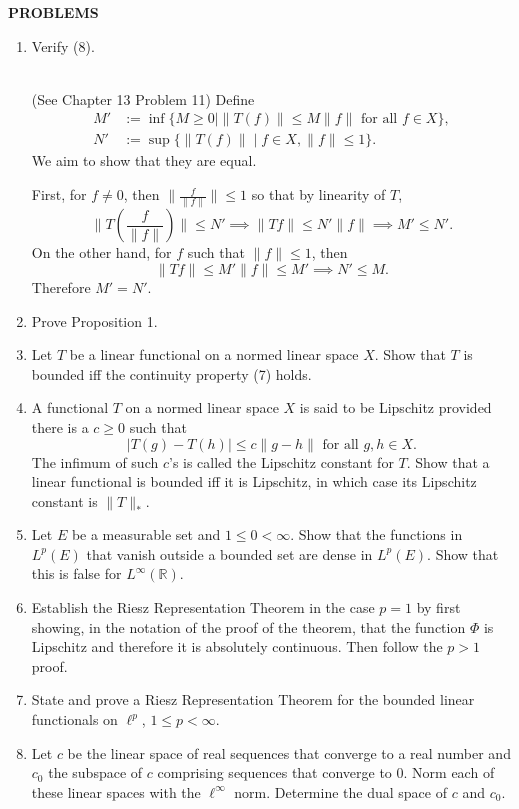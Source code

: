 \begin{center}
	\textbf{PROBLEMS}
\end{center}
\begin{enumerate}
	\setcounter{enumi}{0}
    \item Verify (8).
    
    \ \\(See Chapter 13 Problem 11) 
    Define 
    \[
        \begin{split}
        M'&:=\inf\{M\ge0\mid\|T(f)\|\le M\|f\|\text{ for all }f\in X\},\\
        N'&:=\sup\{\|T(f)\|\mid f\in X, \|f\|\le1\}.
        \end{split}
    \]
    We aim to show that they are equal.
    
    First, for $f\neq0$, then $\|\frac{f}{\|f\|}\|\le1$ so that by linearity of $T$,
    \[\|T(\frac{f}{\|f\|})\|\le N'\implies\|Tf\|\le N'\|f\|\implies M'\le N'.\]
    On the other hand, for $f$ such that $\|f\|\le1$, then
    \[\|Tf\|\le M'\|f\|\le M'\implies N'\le M.\]
    Therefore $M'=N'$.
    \\\item Prove Proposition 1.
    \item Let $T$ be a linear functional on a normed linear space $X$. Show that $T$ is bounded iff the continuity property (7) holds.
    \item A functional $T$ on a normed linear space $X$ is said to be Lipschitz provided there is a $c\ge0$ such that
    \[
        |T(g)-T(h)|\le c\|g-h\|\text{ for all }g,h\in X.  
    \]
    The infimum of such $c$'s is called the Lipschitz constant for $T$. Show that a linear functional is bounded iff it is Lipschitz, in which case its Lipschitz constant is $\|T\|_*$.
    \item Let $E$ be a measurable set and $1\le 0<\infty$. Show that the functions in $L^p(E)$ that vanish outside a bounded set are dense in $L^p(E)$. Show that this is false for $L^\infty(\mathbb{R})$.
    \item Establish the Riesz Representation Theorem in the case $p=1$ by first showing, in the notation of the proof of the theorem, that the function $\Phi$ is Lipschitz and therefore it is absolutely continuous. Then follow the $p>1$ proof.
    \item State and prove a Riesz Representation Theorem for the bounded linear functionals on $\ell^p$, $1\le p<\infty$.
    \item Let $c$ be the linear space of real sequences that converge to a real number and $c_0$ the subspace of $c$ comprising sequences that converge to $0$. Norm each of these linear spaces with the $\ell^\infty$ norm. Determine the dual space of $c$ and $c_0$.

\end{enumerate}
